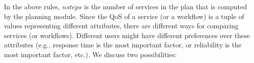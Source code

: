 \documentclass{new_tlp}
\begin{document}
%
In the above rules, $nsteps$ is the number of services  in the plan
that is computed by the planning module. 
Since the QoS of a service (or a workflow) is a tuple of values representing different attributes, 
there are different ways for comparing services (or workflows). 
Different users might have different preferences over these attributes (e.g., response time is the most important factor, or reliability is the most important factor, etc.). 
We discuss two possibilities: 
\end{document}
